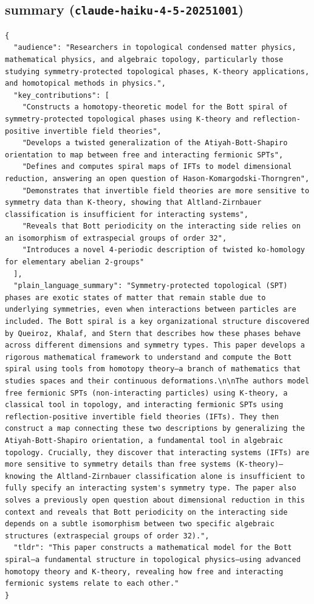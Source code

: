 \documentclass[11pt]{article}
\begin{document}
\subsection*{summary (\texttt{claude-haiku-4-5-20251001})}
\begin{verbatim}
{
  "audience": "Researchers in topological condensed matter physics, mathematical physics, and algebraic topology, particularly those studying symmetry-protected topological phases, K-theory applications, and homotopical methods in physics.",
  "key_contributions": [
    "Constructs a homotopy-theoretic model for the Bott spiral of symmetry-protected topological phases using K-theory and reflection-positive invertible field theories",
    "Develops a twisted generalization of the Atiyah-Bott-Shapiro orientation to map between free and interacting fermionic SPTs",
    "Defines and computes spiral maps of IFTs to model dimensional reduction, answering an open question of Hason-Komargodski-Thorngren",
    "Demonstrates that invertible field theories are more sensitive to symmetry data than K-theory, showing that Altland-Zirnbauer classification is insufficient for interacting systems",
    "Reveals that Bott periodicity on the interacting side relies on an isomorphism of extraspecial groups of order 32",
    "Introduces a novel 4-periodic description of twisted ko-homology for elementary abelian 2-groups"
  ],
  "plain_language_summary": "Symmetry-protected topological (SPT) phases are exotic states of matter that remain stable due to underlying symmetries, even when interactions between particles are included. The Bott spiral is a key organizational structure discovered by Queiroz, Khalaf, and Stern that describes how these phases behave across different dimensions and symmetry types. This paper develops a rigorous mathematical framework to understand and compute the Bott spiral using tools from homotopy theory—a branch of mathematics that studies spaces and their continuous deformations.\n\nThe authors model free fermionic SPTs (non-interacting particles) using K-theory, a classical tool in topology, and interacting fermionic SPTs using reflection-positive invertible field theories (IFTs). They then construct a map connecting these two descriptions by generalizing the Atiyah-Bott-Shapiro orientation, a fundamental tool in algebraic topology. Crucially, they discover that interacting systems (IFTs) are more sensitive to symmetry details than free systems (K-theory)—knowing the Altland-Zirnbauer classification alone is insufficient to fully specify an interacting system's symmetry type. The paper also solves a previously open question about dimensional reduction in this context and reveals that Bott periodicity on the interacting side depends on a subtle isomorphism between two specific algebraic structures (extraspecial groups of order 32).",
  "tldr": "This paper constructs a mathematical model for the Bott spiral—a fundamental structure in topological physics—using advanced homotopy theory and K-theory, revealing how free and interacting fermionic systems relate to each other."
}
\end{verbatim}
\end{document}
